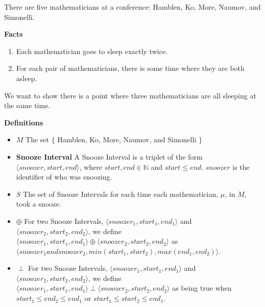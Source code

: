 \documentclass[fleqn]{article}
\newcommand{\triple}[3]{\langle #1,#2,#3 \rangle}
\newcommand{\iunion}{\oplus}
\newcommand{\ioverlap}{\perp}
\begin{document}
There are five mathematicians at a conference: Hamblen, Ko, More, Naumov, and Simonelli.

\textbf{Facts}
\begin{enumerate}
  \item  Each mathematician goes to sleep exactly twice.

  \item  For each pair of mathematicians, there is some time where
         they are both asleep.
\end{enumerate}

We want to show there is a point where three mathematicians are all sleeping at the same time.

\textbf{Definitions}
\begin{itemize}
  \item \textbf{$M$} The set $\lbrace$ Hamblen, Ko, More, Naumov, and Simonelli $\rbrace$
  \item \textbf{Snooze Interval} A Snooze Interval is a triplet of
        the form $\triple{snoozer}{start}{end}$, where $start, end \in \mathbb{N}$ and $start \leq end$. $snoozer$ is the identifier of who was snoozing.
  \item \textbf{$S$} The set of Snooze Intervals for each time each mathematician, $\mu$, in $M$, took a snooze.
  \item \textbf{$\iunion$} For two Snooze Intervals,
                         $\triple{snoozer_1}{start_1}{end_1}$ and
                         $\triple{snoozer_2}{start_2}{end_2}$, we define
                         $\triple{snoozer_1}{start_1}{end_1} \iunion
                          \triple{snoozer_2}{start_2}{end_2}$ as \\
                         $\triple{snoozer_1 and snoozer_2}
                                 {min(start_1, start_2)}
                                 {max(end_1,end_2)}$.

  \item \textbf{$\ioverlap$} For two Snooze Intervals,
                         $\triple{snoozer_1}{start_1}{end_1}$ and
                         $\triple{snoozer_2}{start_2}{end_2}$, we define
                         $\triple{snoozer_1}{start_1}{end_1} \ioverlap
                          \triple{snoozer_2}{start_2}{end_2}$ as being true
                         when\\ $start_1 \leq end_2 \leq end_1$ or
                                $start_1 \leq start_2 \leq end_1$.


\end{itemize}
\end{document}
